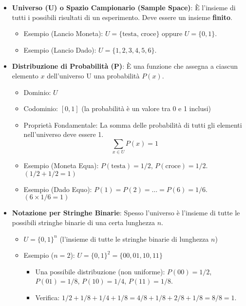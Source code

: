 \begin{itemize}
    \item \textbf{Universo (U) o Spazio Campionario (Sample Space)}: È l'insieme di tutti i possibili risultati di un esperimento. Deve essere un insieme \textbf{finito}.
    \begin{itemize}
        \item Esempio (Lancio Moneta): $U = \{ \text{testa, croce} \}$ oppure $U = \{0, 1\}$.
        \item Esempio (Lancio Dado): $U = \{1, 2, 3, 4, 5, 6\}$.
    \end{itemize}
    \item \textbf{Distribuzione di Probabilità (P)}: È una funzione che assegna a ciascun elemento $x$ dell'universo U una probabilità $P(x)$.
    \begin{itemize}
        \item Dominio: $U$
        \item Codominio: $[0, 1]$ (la probabilità è un valore tra 0 e 1 inclusi)
        \item Proprietà Fondamentale: La somma delle probabilità di tutti gli elementi nell'universo deve essere 1.
        \[ \sum_{x \in U} P(x) = 1 \]
        \item Esempio (Moneta Equa): $P(\text{testa}) = 1/2$, $P(\text{croce}) = 1/2$. $(1/2 + 1/2 = 1)$
        \item Esempio (Dado Equo): $P(1) = P(2) = \dots = P(6) = 1/6$. $(6 \times 1/6 = 1)$
    \end{itemize}
    \item \textbf{Notazione per Stringhe Binarie}: Spesso l'universo è l'insieme di tutte le possibili stringhe binarie di una certa lunghezza $n$.
    \begin{itemize}
        \item $U = \{0,1\}^n$ (l'insieme di tutte le stringhe binarie di lunghezza $n$)
        \item Esempio ($n=2$): $U = \{0,1\}^2 = \{00, 01, 10, 11\}$
            \begin{itemize}
                \item Una possibile distribuzione (non uniforme): $P(00) = 1/2$, $P(01) = 1/8$, $P(10) = 1/4$, $P(11) = 1/8$.
                \item Verifica: $1/2 + 1/8 + 1/4 + 1/8 = 4/8 + 1/8 + 2/8 + 1/8 = 8/8 = 1$.
            \end{itemize}
    \end{itemize}
\end{itemize}

